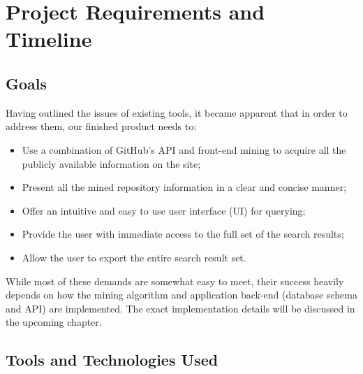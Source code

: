 \chapter{Project Requirements and Timeline}

\section{Goals}

Having outlined the issues of existing tools, it became apparent that in order to address them, our finished product needs to:

\begin{itemize}
    \item Use a combination of GitHub's API and front-end mining to acquire all the publicly available information on the site;
    \item Present all the mined repository information in a clear and concise manner;
    \item Offer an intuitive and easy to use user interface (UI) for querying;
    \item Provide the user with immediate access to the full set of the search results;
    \item Allow the user to export the entire search result set.
\end{itemize}

While most of these demands are somewhat easy to meet, their success heavily depends on how the mining algorithm and application back-end (database schema and API) are implemented.
The exact implementation details will be discussed in the upcoming chapter.

\section{Tools and Technologies Used}


